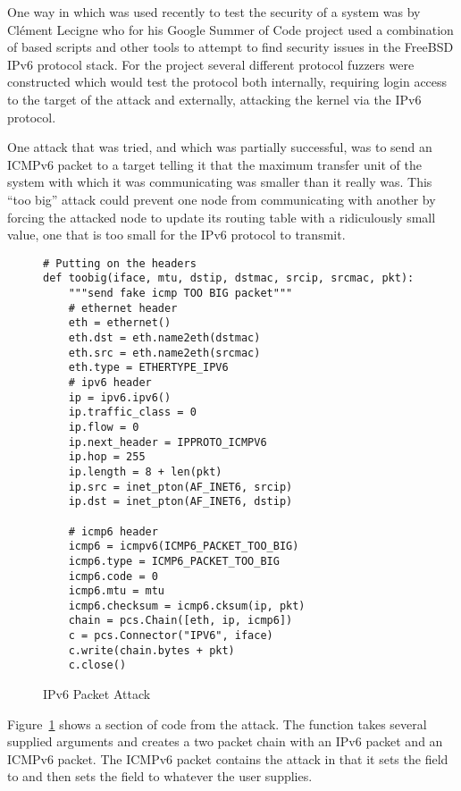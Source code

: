 \documentclass[11pt]{article}
\begin{document}
One way in which  was used recently to test the security
of a system was by Cl\'ement Lecigne who for his Google Summer of Code
project \cite{lecigne} used a combination of  based
scripts and other tools to attempt to find security issues in the
FreeBSD IPv6 protocol stack.  For the project several different
protocol fuzzers were constructed which would test the protocol both
internally, requiring login access to the target of the attack and
externally, attacking the kernel via the IPv6 protocol.

One attack that was tried, and which was partially successful, was to
send an ICMPv6 packet to a target telling it that the maximum transfer
unit of the system with which it was communicating was smaller than it
really was.  This ``too big'' attack could prevent one node from
communicating with another by forcing the attacked node to update its
routing table with a ridiculously small value, one that is too small
for the IPv6 protocol to transmit.  

\begin{figure}
  \centering
\begin{verbatim}
# Putting on the headers
def toobig(iface, mtu, dstip, dstmac, srcip, srcmac, pkt):
    """send fake icmp TOO BIG packet"""
    # ethernet header
    eth = ethernet()
    eth.dst = eth.name2eth(dstmac)
    eth.src = eth.name2eth(srcmac)
    eth.type = ETHERTYPE_IPV6
    # ipv6 header
    ip = ipv6.ipv6()
    ip.traffic_class = 0
    ip.flow = 0
    ip.next_header = IPPROTO_ICMPV6
    ip.hop = 255
    ip.length = 8 + len(pkt)
    ip.src = inet_pton(AF_INET6, srcip)
    ip.dst = inet_pton(AF_INET6, dstip)

    # icmp6 header
    icmp6 = icmpv6(ICMP6_PACKET_TOO_BIG)
    icmp6.type = ICMP6_PACKET_TOO_BIG 
    icmp6.code = 0
    icmp6.mtu = mtu
    icmp6.checksum = icmp6.cksum(ip, pkt)
    chain = pcs.Chain([eth, ip, icmp6])
    c = pcs.Connector("IPV6", iface)
    c.write(chain.bytes + pkt)
    c.close()
\end{verbatim}
  \caption{IPv6 Packet Attack}
  \label{fig:ipv6-packet-attack}
\end{figure}

Figure~\ref{fig:ipv6-packet-attack} shows a section of code from the
 attack.  The  function takes several
supplied arguments and creates a two packet chain with an IPv6 packet
and an ICMPv6 packet.  The ICMPv6 packet contains the attack in that
it sets the  field to
 and then sets the 
field to whatever the user supplies.
\end{document}
